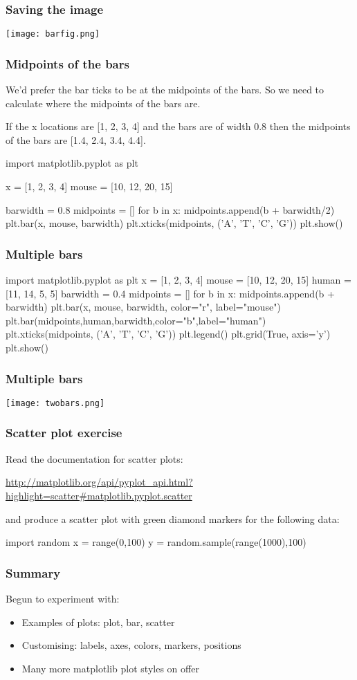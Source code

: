 \documentclass{beamer}
\begin{document}
\begin{frame}[fragile]
\frametitle{Saving the image}
\texttt{[image: barfig.png]}
\end{frame}

\begin{frame}[fragile]
\frametitle{Midpoints of the bars}
We'd prefer the bar ticks to be at the midpoints of the bars. So we
need to calculate where the midpoints of the bars are.

If the x locations are [1, 2, 3, 4] and the bars are of width 0.8 then
the midpoints of the bars are [1.4, 2.4, 3.4, 4.4].

\begin{code}
import matplotlib.pyplot as plt

x = [1, 2, 3, 4]
mouse = [10, 12, 20, 15]

barwidth = 0.8
midpoints = []
for b in x:
   midpoints.append(b + barwidth/2)
plt.bar(x, mouse, barwidth)
plt.xticks(midpoints, ('A', 'T', 'C', 'G'))
plt.show()
\end{code}
\end{frame}

\begin{frame}[fragile]
\frametitle{Multiple bars}
\begin{code}
import matplotlib.pyplot as plt
x = [1, 2, 3, 4]
mouse = [10, 12, 20, 15]
human = [11, 14, 5, 5]
barwidth = 0.4
midpoints = []
for b in x:
   midpoints.append(b + barwidth)
plt.bar(x, mouse, barwidth, color="r", label="mouse")
plt.bar(midpoints,human,barwidth,color="b",label="human")
plt.xticks(midpoints, ('A', 'T', 'C', 'G'))
plt.legend()
plt.grid(True, axis='y')
plt.show()
\end{code}
\end{frame}

\begin{frame}[fragile]
\frametitle{Multiple bars}
\texttt{[image: twobars.png]}
\end{frame}


\begin{frame}[fragile]
\frametitle{Scatter plot exercise}
Read the documentation for scatter plots:

\url{http://matplotlib.org/api/pyplot_api.html?highlight=scatter#matplotlib.pyplot.scatter}

and produce a scatter plot with green diamond
markers for the following data:
\begin{code}
import random
x = range(0,100)
y = random.sample(range(1000),100)
\end{code}
\end{frame}

\begin{frame}[fragile]
\frametitle{Summary}
Begun to experiment with:
\begin{itemize}
\item Examples of plots: plot, bar, scatter
\item Customising: labels, axes, colors, markers, positions
\item Many more matplotlib plot styles on offer 
\end{itemize}
\end{frame}
\end{document}
